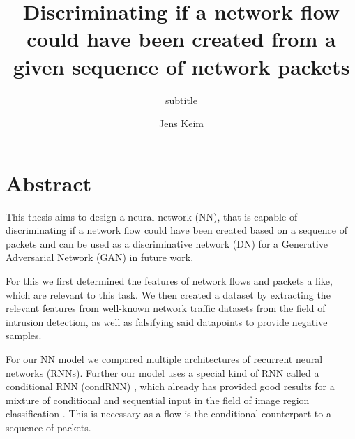 \documentclass[
	ngerman,
	ruledheaders=section,%
	class=report,%
	thesis={type=bachelor},%
	accentcolor=9c,%
	custommargins=true,%
	marginpar=false,%
	parskip=half-,%
	fontsize=11pt,%
]{tudapub}
\begin{document}

\title{Discriminating if a network flow could have been created from a given sequence of network packets}
\subtitle{subtitle}
\author[J. Keim]{Jens Keim}%


\submissiondate{\today}
\examdate{\today}


\maketitle

\affidavit

\tableofcontents

\chapter{Abstract}

This thesis aims to design a neural network (NN), that is capable of discriminating if a network flow could have been created based on a sequence of packets and can be used as a discriminative network (DN) for a Generative Adversarial Network (GAN) in future work.

For this we first determined the features of network flows and packets a like, which are relevant to this task.
We then created a dataset by extracting the relevant features from well-known network traffic datasets from the field of intrusion detection, as well as falsifying said datapoints to provide negative samples.

For our NN model we compared multiple architectures of recurrent neural networks (RNNs).
Further our model uses a special kind of RNN called a conditional RNN (condRNN) \cite{remyPhilipperemyCondRnn2020}, which already has provided good results for a mixture of conditional and sequential input in the field of image region classification \cite{karpathyDeepVisualSemanticAlignments2015} \cite{vinyalsShowTellNeural2015}.
This is necessary as a flow is the conditional counterpart to a sequence of packets.
\end{document}
